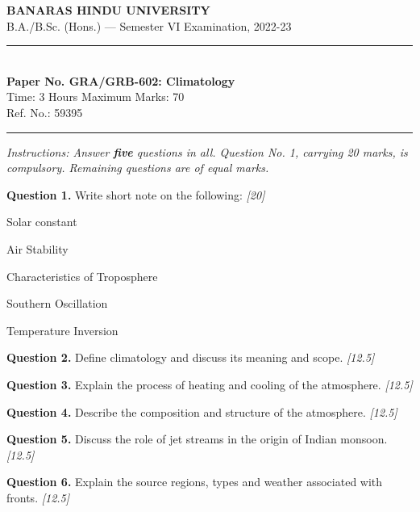 \documentclass[11pt,a4paper]{article}
\newcommand{\pts}[1]{\hfill   \textit{[#1]}}
\begin{document}
\begin{center}
  {\large\bfseries BANARAS HINDU UNIVERSITY}\\[2pt]
  {\normalsize B.A./B.Sc. (Hons.) --- Semester VI Examination, 2022-23}\\[6pt]
  \rule{0.8\linewidth}{0.5pt}\\[6pt]
  {\large\bfseries Paper No. GRA/GRB-602: Climatology}\\[4pt]
  {\normalsize Time: 3 Hours \hfill Maximum Marks: 70}\\[2pt]
  {\small Ref. No.: 59395}
\end{center}
\rule{\linewidth}{0.4pt}
\smallskip



\noindent   \textit{Instructions: Answer   \textbf{five} questions in all. Question No. 1, carrying 20 marks, is compulsory. Remaining questions are of equal marks.}
\bigskip




\noindent   \textbf{Question 1.} Write short note on the following: \pts{20}

\begin{parts}
  \item Solar constant
  \item Air Stability
  \item Characteristics of Troposphere
  \item Southern Oscillation
  \item Temperature Inversion
\end{parts}

\medskip


\noindent   \textbf{Question 2.} Define climatology and discuss its meaning and scope. \pts{12.5}

\medskip


\noindent   \textbf{Question 3.} Explain the process of heating and cooling of the atmosphere. \pts{12.5}

\medskip


\noindent   \textbf{Question 4.} Describe the composition and structure of the atmosphere. \pts{12.5}

\medskip


\noindent   \textbf{Question 5.} Discuss the role of jet streams in the origin of Indian monsoon. \pts{12.5}

\medskip


\noindent   \textbf{Question 6.} Explain the source regions, types and weather associated with fronts. \pts{12.5}
\end{document}
